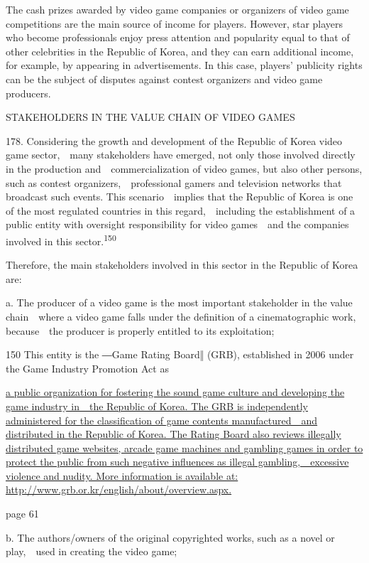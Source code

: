 \documentclass[
]{article}
\begin{document}
{The cash prizes awarded by video game companies or organizers of video
game competitions are the main source of income for players. However,
star players who become professionals enjoy press attention and
popularity equal to that of other celebrities in the Republic of Korea,
and they can earn additional income, for example, by appearing in
advertisements. }{In this case, players' publicity rights can be the
subject of disputes }{against contest organizers and video game
producers.}

{STAKEHOLDERS IN THE VALUE CHAIN OF VIDEO GAMES}

{178. }{Considering the growth and development of the Republic of Korea
video game sector,~~many stakeholders have emerged, not only those
involved directly in the production and~~commercialization of video
games, but also other persons, such as contest organizers,~~professional
gamers and television networks that broadcast such events. This
scenario~~implies that the Republic of Korea is one of the most
regulated countries in this regard,~~including the establishment of a
public entity with oversight responsibility for video games~~and the
companies involved in this sector.}\textsuperscript{{150}}

{Therefore, the main stakeholders involved in this sector in the
Republic of Korea are:}

{a. The producer of a video game is the most important stakeholder in
the value chain~~where a video game falls under the definition of a
cinematographic work, because~~the producer is properly entitled to its
exploitation;}

{150 }{This entity is the ―Game Rating Board‖ (GRB), established in 2006
under the }{Game Industry Promotion Act }{as}

\href{http://www.grb.or.kr/english/about/overview.aspx}{{a public
organization for fostering the sound game culture and developing the
game industry in~~the Republic of Korea. The GRB is independently
administered for the classification of game contents manufactured~~and
distributed in the Republic of Korea. The Rating Board also reviews
illegally distributed game websites, arcade game machines and gambling
games in order to protect the public from such negative influences as
illegal gambling,~~excessive violence and nudity. More information is
available at: http://www.grb.or.kr/english/about/overview.aspx.}}

{page 61}

{b. The authors/owners of the original copyrighted works, such as a
novel or play,~~used in creating the video game;}
\end{document}
